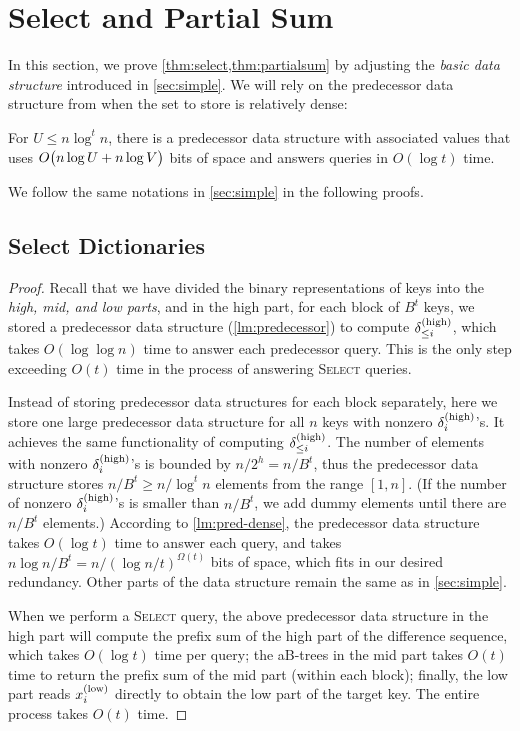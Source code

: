 \documentclass{article}
\theoremstyle{plain}
\theoremstyle{definition}  \newtheorem{definition}[theorem]{Definition}
\DeclarePairedDelimiter{\bk}{(}{)}
\newcommand{\xlow}[1][i]{x_{#1}^{(\textup{low})}}
\newcommand{\deltahigh}[1][i]{\delta_{#1}^{(\textup{high})}}
\newcommand{\select}{\textup{\textsc{Select}}\xspace}
\begin{document}
\section{Select and Partial Sum}
\label{sec:select}

In this section, we prove \cref{thm:select,thm:partialsum} by adjusting the \emph{basic data structure} introduced in \cref{sec:simple}. We will rely on the predecessor data structure from \cite{patrascu2006timespace} when the set to store is relatively dense:

\begin{lemma}
  \label{lm:pred-dense}
  For $U \le n \log^{t} n$, there is a predecessor data structure with associated values that uses $O\bk[\big]{n \log U + n \log V}$ bits of space and answers queries in $O(\log t)$ time.
\end{lemma}

We follow the same notations in \cref{sec:simple} in the following proofs.

\subsection{Select Dictionaries}

\thmSelect*

\begin{proof}
  Recall that we have divided the binary representations of keys into the \emph{high, mid, and low parts}, and in the high part, for each block of $B^t$ keys, we stored a predecessor data structure (\cref{lm:predecessor}) to compute $\deltahigh[\le i]$, which takes $O(\log \log n)$ time to answer each predecessor query. This is the only step exceeding $O(t)$ time in the process of answering \select queries.

  Instead of storing predecessor data structures for each block separately, here we store one large predecessor data structure for all $n$ keys with nonzero $\deltahigh$'s. It achieves the same functionality of computing $\deltahigh[\le i]$. The number of elements with nonzero $\deltahigh$'s is bounded by $n / 2^h = n / B^t$, thus the predecessor data structure stores $n / B^t \ge n / \log^t n$ elements from the range $[1, n]$. (If the number of nonzero $\deltahigh$'s is smaller than $n / B^t$, we add dummy elements until there are $n / B^t$ elements.) According to \cref{lm:pred-dense}, the predecessor data structure takes $O(\log t)$ time to answer each query, and takes $n \log n / B^t = n / (\log n / t)^{\Omega(t)}$ bits of space, which fits in our desired redundancy. Other parts of the data structure remain the same as in \cref{sec:simple}.

  When we perform a \select query, the above predecessor data structure in the high part will compute the prefix sum of the high part of the difference sequence, which takes $O(\log t)$ time per query; the aB-trees in the mid part takes $O(t)$ time to return the prefix sum of the mid part (within each block); finally, the low part reads $\xlow[i]$ directly to obtain the low part of the target key. The entire process takes $O(t)$ time.
\end{proof}
\end{document}

